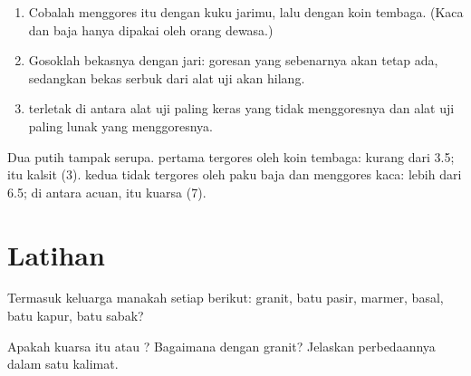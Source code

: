 \begin{method}\label{met:g6:rocks-and-minerals:scratch}
\begin{enumerate}
  \item Cobalah menggores  itu dengan kuku jarimu, lalu dengan koin
        tembaga. (Kaca dan baja hanya dipakai oleh orang dewasa.)
  \item Gosoklah bekasnya dengan jari: goresan yang sebenarnya akan tetap
        ada, sedangkan bekas serbuk dari alat uji akan hilang.
  \item {} terletak di antara  alat uji paling keras
        yang tidak menggoresnya dan  alat uji paling lunak yang
        menggoresnya.
\end{enumerate}
\end{method}

\begin{example}\label{ex:g6:rocks-and-minerals:quartz-calcite}
Dua  putih tampak serupa.  pertama tergores oleh koin tembaga:
 kurang dari 3.5;  itu kalsit (3).  kedua tidak
tergores oleh paku baja dan menggores kaca:  lebih dari 6.5; di
antara  acuan,  itu kuarsa (7).
\end{example}

\section{Latihan}

\begin{exercise}[$\star$]\label{exo:g6:rocks-and-minerals:1}
Termasuk keluarga manakah setiap  berikut: granit, batu pasir, marmer,
basal, batu kapur, batu sabak?
\end{exercise}

\begin{exercise}[$\star$]\label{exo:g6:rocks-and-minerals:2}
Apakah kuarsa itu  atau ? Bagaimana dengan granit? Jelaskan
perbedaannya dalam satu kalimat.
\end{exercise}

